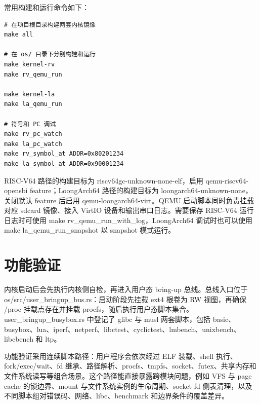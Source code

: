 \documentclass[12pt,openany,oneside,AutoFakeBold=true]{ctexbook}
\newcommand{\code}[1]{\textnormal{\rmfamily #1}}
\begin{document}
常用构建和运行命令如下：

\begin{lstlisting}
# 在项目根目录构建两套内核镜像
make all

# 在 os/ 目录下分别构建和运行
make kernel-rv
make rv_qemu_run

make kernel-la
make la_qemu_run

# 符号和 PC 调试
make rv_pc_watch
make la_pc_watch
make rv_symbol_at ADDR=0x80201234
make la_symbol_at ADDR=0x90001234
\end{lstlisting}

RISC-V64 路径的构建目标为 \code{riscv64gc-unknown-none-elf}，启用 \code{qemu-riscv64-opensbi} feature；LoongArch64 路径的构建目标为 \code{loongarch64-unknown-none}，关闭默认 feature 后启用 \code{qemu-loongarch64-virt}。QEMU 启动脚本同时负责挂载对应 sdcard 镜像、接入 VirtIO 设备和输出串口日志。需要保存 RISC-V64 运行日志时可使用 \code{make rv\_qemu\_run\_with\_log}，LoongArch64 调试时也可以使用 \code{make la\_qemu\_run\_snapshot} 以 snapshot 模式运行。

\section{功能验证}

内核启动后会先执行内核侧自检，再进入用户态 bring-up 总线。总线入口位于 \code{os/src/user\_bringup\_bus.rs}：启动阶段先挂载 ext4 根卷为 RW 视图，再确保 \code{/proc} 挂载点存在并挂载 procfs，随后执行用户态脚本集合。\code{user\_bringup\_busybox.rs} 中登记了 glibc 与 musl 两套脚本，包括 basic、busybox、lua、iperf、netperf、libctest、cyclictest、lmbench、unixbench、libcbench 和 ltp。

功能验证采用连续脚本路径：用户程序会依次经过 ELF 装载、shell 执行、fork/exec/wait、fd 继承、路径解析、procfs、tmpfs、socket、futex、共享内存和文件系统读写等组合场景。这个路径能直接暴露跨模块问题，例如 VFS 与 page cache 的锁边界、mount 与文件系统实例的生命周期、socket fd 侧表清理，以及不同脚本组对错误码、网络、libc、benchmark 和边界条件的覆盖差异。
\end{document}
